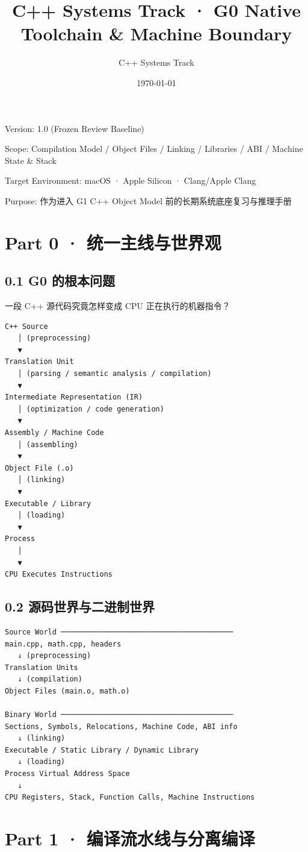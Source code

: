 \documentclass[11pt,a4paper]{article}
\title{\textbf{\Large C++ Systems Track · G0 Native Toolchain \& Machine Boundary}}
\author{C++ Systems Track}
\date{\today}
\begin{document}
\maketitle
\tableofcontents
\newpage

Version: 1.0 (Frozen Review Baseline)

Scope: Compilation Model / Object Files / Linking / Libraries / ABI / Machine State \& Stack

Target Environment: macOS · Apple Silicon · Clang/Apple Clang

Purpose: 作为进入 G1 C++ Object Model 前的长期系统底座复习与推理手册

\section{Part 0 · 统一主线与世界观}
\subsection{0.1 G0 的根本问题}
一段 C++ 源代码究竟怎样变成 CPU 正在执行的机器指令？

\begin{lstlisting}[language=text]
C++ Source
   │ (preprocessing)
   ▼
Translation Unit
   │ (parsing / semantic analysis / compilation)
   ▼
Intermediate Representation (IR)
   │ (optimization / code generation)
   ▼
Assembly / Machine Code
   │ (assembling)
   ▼
Object File (.o)
   │ (linking)
   ▼
Executable / Library
   │ (loading)
   ▼
Process
   │
   ▼
CPU Executes Instructions
\end{lstlisting}
\subsection{0.2 源码世界与二进制世界}
\begin{lstlisting}[language=text]
Source World ────────────────────────────────────────
main.cpp, math.cpp, headers
   ↓ (preprocessing)
Translation Units
   ↓ (compilation)
Object Files (main.o, math.o)

Binary World ────────────────────────────────────────
Sections, Symbols, Relocations, Machine Code, ABI info
   ↓ (linking)
Executable / Static Library / Dynamic Library
   ↓ (loading)
Process Virtual Address Space
   ↓
CPU Registers, Stack, Function Calls, Machine Instructions
\end{lstlisting}
\section{Part 1 · 编译流水线与分离编译}
\end{document}
